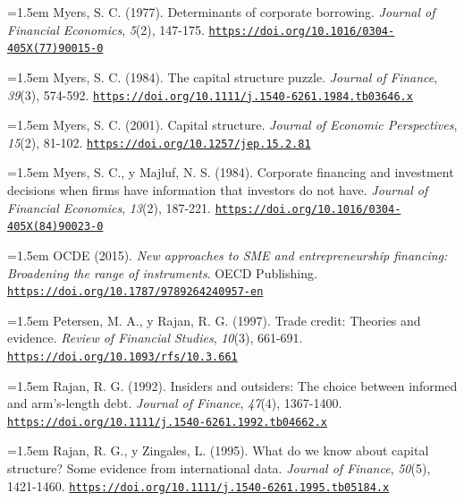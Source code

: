 \documentclass[10pt,a4paper]{article}
\begin{document}
\noindent\hangindent=1.5em Myers, S. C. (1977). Determinants of corporate borrowing. \textit{Journal of Financial Economics}, \textit{5}(2), 147-175. \href{https://doi.org/10.1016/0304-405X(77)90015-0}{\nolinkurl{https://doi.org/10.1016/0304-405X(77)90015-0}}

\noindent\hangindent=1.5em Myers, S. C. (1984). The capital structure puzzle. \textit{Journal of Finance}, \textit{39}(3), 574-592. \href{https://doi.org/10.1111/j.1540-6261.1984.tb03646.x}{\nolinkurl{https://doi.org/10.1111/j.1540-6261.1984.tb03646.x}}

\noindent\hangindent=1.5em Myers, S. C. (2001). Capital structure. \textit{Journal of Economic Perspectives}, \textit{15}(2), 81-102. \href{https://doi.org/10.1257/jep.15.2.81}{\nolinkurl{https://doi.org/10.1257/jep.15.2.81}}

\noindent\hangindent=1.5em Myers, S. C., y Majluf, N. S. (1984). Corporate financing and investment decisions when firms have information that investors do not have. \textit{Journal of Financial Economics}, \textit{13}(2), 187-221. \href{https://doi.org/10.1016/0304-405X(84)90023-0}{\nolinkurl{https://doi.org/10.1016/0304-405X(84)90023-0}}

\noindent\hangindent=1.5em OCDE (2015). \textit{New approaches to SME and entrepreneurship financing: Broadening the range of instruments}. OECD Publishing. \href{https://doi.org/10.1787/9789264240957-en}{\nolinkurl{https://doi.org/10.1787/9789264240957-en}}

\noindent\hangindent=1.5em Petersen, M. A., y Rajan, R. G. (1997). Trade credit: Theories and evidence. \textit{Review of Financial Studies}, \textit{10}(3), 661-691. \href{https://doi.org/10.1093/rfs/10.3.661}{\nolinkurl{https://doi.org/10.1093/rfs/10.3.661}}

\noindent\hangindent=1.5em Rajan, R. G. (1992). Insiders and outsiders: The choice between informed and arm's-length debt. \textit{Journal of Finance}, \textit{47}(4), 1367-1400. \href{https://doi.org/10.1111/j.1540-6261.1992.tb04662.x}{\nolinkurl{https://doi.org/10.1111/j.1540-6261.1992.tb04662.x}}

\noindent\hangindent=1.5em Rajan, R. G., y Zingales, L. (1995). What do we know about capital structure? Some evidence from international data. \textit{Journal of Finance}, \textit{50}(5), 1421-1460. \href{https://doi.org/10.1111/j.1540-6261.1995.tb05184.x}{\nolinkurl{https://doi.org/10.1111/j.1540-6261.1995.tb05184.x}}
\end{document}
